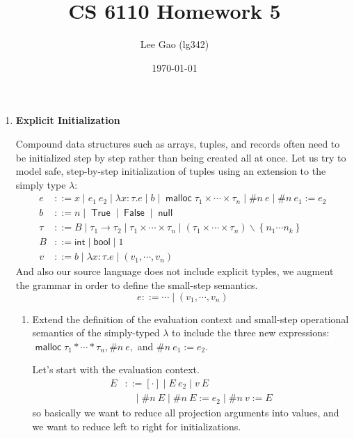 \documentclass[11pt,a4paper]{article}
\author{Lee Gao (lg342)}
\title{CS 6110 Homework 5}
\date{\today}
\newcommand {\coo} [1] {\ensuremath{\operatorname{\mathsf{#1}}}}
\newcommand {\co} [1] {\coo{#1}}
\newcommand{\True}{\co{True}}
\newcommand{\False}{\co{False}}
\newcommand{\Rec}[1]{\left\{#1\right\}}
\newcommand{\g}[1]{\textsf{#1}}
\newcommand{\Malloc}{\co{malloc}}
\newcommand{\Null}{\co{null}}
\begin{document}
\maketitle
\setlength{\parindent}{0pt}

\begin{enumerate}[label=\textbf{Excercise \arabic*\ }]
\setcounter{enumi}{0}
\item \textbf{Explicit Initialization}

Compound data structures such as arrays, tuples, and records often need to be initialized step by step rather than being created all at once. Let us try to model safe, step-by-step initialization of tuples using an extension to the simply type $\lambda$:
\begin{align*}
e &::= x \mid e_1~e_2 \mid \lambda x:\tau.e \mid b \mid \Malloc \tau_1 \times \cdots \times \tau_n \mid \#n~e \mid \#n~e_1 := e_2 \\
b &::= n \mid \True \mid \False \mid \Null \\
\tau &::= B \mid \tau_1 \to \tau_2 \mid \tau_1 \times \cdots \times \tau_n \mid (\tau_1 \times \cdots \times \tau_n)\backslash\Rec{n_1 \cdots n_k} \\
B &::= \g{int} \mid \g{bool} \mid 1 \\
v &::= b \mid \lambda x:\tau.e \mid (v_1, \cdots, v_n)
\end{align*}
And also our source language does not include explicit typles, we augment the grammar in order to define the small-step semantics.
$$
e ::= \cdots \mid (v_1,\cdots,v_n)
$$
\begin{enumerate}
\item Extend the definition of the evaluation context and small-step operational semantics of the simply-typed $\lambda$ to include the three new expressions: $\Malloc \tau_1 * \cdots * \tau_n, \#n~e,$ and $\#n~e_1:=e_2$.

Let's start with the evaluation context.
\begin{align*}
E &::= [\cdot] \mid E~e_2 \mid v~E \\ &~~~~\mid \#n~E \mid \#n~E := e_2 \mid \#n~v := E
\end{align*}
so basically we want to reduce all projection arguments into values, and we want to reduce left to right for initializations.


\end{enumerate}
\end{enumerate}
\end{document}
